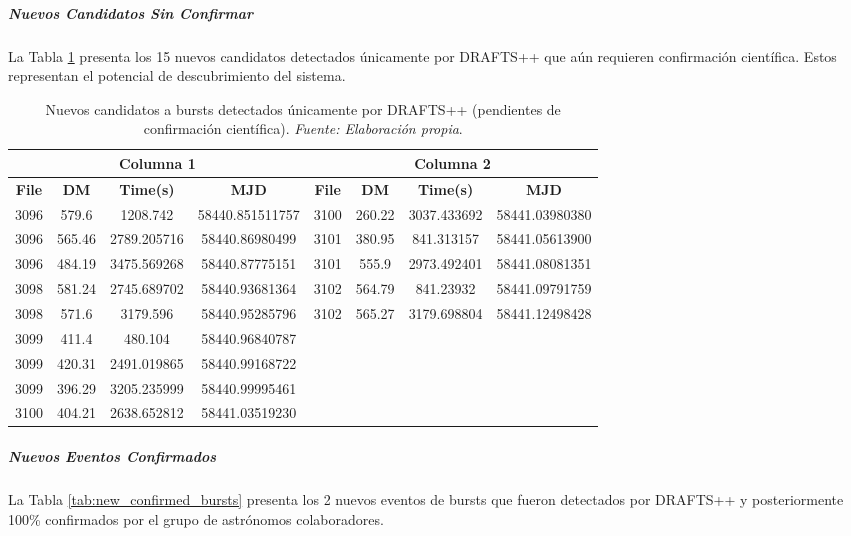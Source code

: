 \subparagraph{Nuevos Candidatos Sin Confirmar}

La Tabla \ref{tab:candidate_bursts} presenta los 15 nuevos candidatos detectados únicamente por DRAFTS++ que aún requieren confirmación científica. Estos representan el potencial de descubrimiento del sistema.

\begin{table}[H]
    \centering
    \caption{Nuevos candidatos a bursts detectados únicamente por DRAFTS++ (pendientes de confirmación científica). \textit{Fuente: Elaboración propia}.}
    \label{tab:candidate_bursts}
    \begin{tabular}{|c|c|c|c|c|c|c|c|}
        \hline
        \multicolumn{4}{|c|}{\textbf{Columna 1}} & \multicolumn{4}{|c|}{\textbf{Columna 2}} \\
        \hline
        \textbf{File} & \textbf{DM} & \textbf{Time(s)} & \textbf{MJD} & \textbf{File} & \textbf{DM} & \textbf{Time(s)} & \textbf{MJD} \\
        \hline
        3096 & 579.6 & 1208.742 & 58440.851511757 & 3100 & 260.22 & 3037.433692 & 58441.03980380 \\
        3096 & 565.46 & 2789.205716 & 58440.86980499 & 3101 & 380.95 & 841.313157 & 58441.05613900 \\
        3096 & 484.19 & 3475.569268 & 58440.87775151 & 3101 & 555.9 & 2973.492401 & 58441.08081351 \\
        3098 & 581.24 & 2745.689702 & 58440.93681364 & 3102 & 564.79 & 841.23932 & 58441.09791759 \\
        3098 & 571.6 & 3179.596 & 58440.95285796 & 3102 & 565.27 & 3179.698804 & 58441.12498428 \\
        3099 & 411.4 & 480.104 & 58440.96840787 & & & & \\
        3099 & 420.31 & 2491.019865 & 58440.99168722 & & & & \\
        3099 & 396.29 & 3205.235999 & 58440.99995461 & & & & \\
        3100 & 404.21 & 2638.652812 & 58441.03519230 & & & & \\
        \hline
    \end{tabular}
\end{table}

\subparagraph{Nuevos Eventos Confirmados}

La Tabla \ref{tab:new_confirmed_bursts} presenta los 2 nuevos eventos de bursts que fueron detectados por DRAFTS++ y posteriormente 100\% confirmados por el grupo de astrónomos colaboradores.

